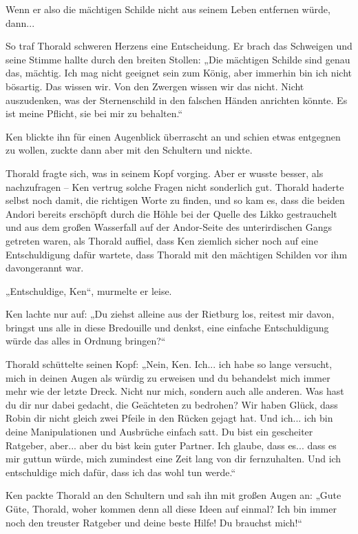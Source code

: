 Wenn er also die mächtigen Schilde nicht aus seinem Leben entfernen würde, dann...

So traf Thorald schweren Herzens eine Entscheidung. Er brach das Schweigen und seine Stimme hallte durch den breiten Stollen: „Die mächtigen Schilde sind genau das, mächtig. Ich mag nicht geeignet sein zum König, aber immerhin bin ich nicht bösartig. Das wissen wir. Von den Zwergen wissen wir das nicht. Nicht auszudenken, was der Sternenschild in den falschen Händen anrichten könnte. Es ist meine Pflicht, sie bei mir zu behalten.“

Ken blickte ihn für einen Augenblick überrascht an und schien etwas entgegnen zu wollen, zuckte dann aber mit den Schultern und nickte.

Thorald fragte sich, was in seinem Kopf vorging. Aber er wusste besser, als nachzufragen – Ken vertrug solche Fragen nicht sonderlich gut. Thorald haderte selbst noch damit, die richtigen Worte zu finden, und so kam es, dass die beiden Andori bereits erschöpft durch die Höhle bei der Quelle des Likko gestrauchelt und aus dem großen Wasserfall auf der Andor-Seite des unterirdischen Gangs getreten waren, als Thorald auffiel, dass Ken ziemlich sicher noch auf eine Entschuldigung dafür wartete, dass Thorald mit den mächtigen Schilden vor ihm davongerannt war.

„Entschuldige, Ken“, murmelte er leise.

Ken lachte nur auf: „Du ziehst alleine aus der Rietburg los, reitest mir davon, bringst uns alle in diese Bredouille und denkst, eine einfache Entschuldigung würde das alles in Ordnung bringen?“

Thorald schüttelte seinen Kopf: „Nein, Ken. Ich... ich habe so lange versucht, mich in deinen Augen als würdig zu erweisen und du behandelst mich immer mehr wie der letzte Dreck. Nicht nur mich, sondern auch alle anderen. Was hast du dir nur dabei gedacht, die Geächteten zu bedrohen? Wir haben Glück, dass Robin dir nicht gleich zwei Pfeile in den Rücken gejagt hat. Und ich... ich bin deine Manipulationen und Ausbrüche einfach satt. Du bist ein gescheiter Ratgeber, aber... aber du bist kein guter Partner. Ich glaube, dass es... dass es mir guttun würde, mich zumindest eine Zeit lang von dir fernzuhalten. Und ich entschuldige mich dafür, dass ich das wohl tun werde.“

Ken packte Thorald an den Schultern und sah ihn mit großen Augen an: „Gute Güte, Thorald, woher kommen denn all diese Ideen auf einmal? Ich bin immer noch den treuster Ratgeber und deine beste Hilfe! Du brauchst mich!“

